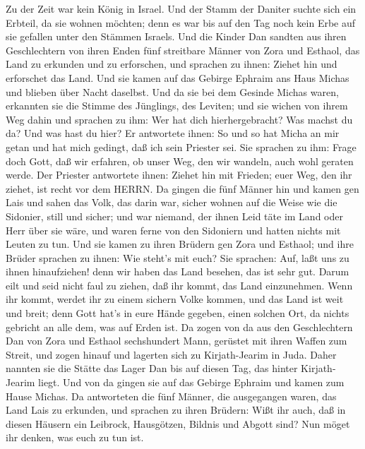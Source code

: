  Zu der Zeit war kein König in Israel. Und der Stamm der
Daniter suchte sich ein Erbteil, da sie wohnen möchten; denn es war bis
auf den Tag noch kein Erbe auf sie gefallen unter den Stämmen Israels.
 Und die Kinder Dan sandten aus ihren Geschlechtern von
ihren Enden fünf streitbare Männer von Zora und Esthaol, das Land zu
erkunden und zu erforschen, und sprachen zu ihnen: Ziehet hin und
erforschet das Land. Und sie kamen auf das Gebirge Ephraim ans Haus
Michas und blieben über Nacht daselbst.  Und da sie bei dem
Gesinde Michas waren, erkannten sie die Stimme des Jünglings, des
Leviten; und sie wichen von ihrem Weg dahin und sprachen zu ihm: Wer hat
dich hierhergebracht? Was machst du da? Und was hast du hier?
 Er antwortete ihnen: So und so hat Micha an mir getan und
hat mich gedingt, daß ich sein Priester sei.  Sie sprachen
zu ihm: Frage doch Gott, daß wir erfahren, ob unser Weg, den wir
wandeln, auch wohl geraten werde.  Der Priester antwortete
ihnen: Ziehet hin mit Frieden; euer Weg, den ihr ziehet, ist recht vor
dem HERRN.  Da gingen die fünf Männer hin und kamen gen Lais
und sahen das Volk, das darin war, sicher wohnen auf die Weise wie die
Sidonier, still und sicher; und war niemand, der ihnen Leid täte im Land
oder Herr über sie wäre, und waren ferne von den Sidoniern und hatten
nichts mit Leuten zu tun.  Und sie kamen zu ihren Brüdern
gen Zora und Esthaol; und ihre Brüder sprachen zu ihnen: Wie steht's mit
euch?  Sie sprachen: Auf, laßt uns zu ihnen hinaufziehen!
denn wir haben das Land besehen, das ist sehr gut. Darum eilt und seid
nicht faul zu ziehen, daß ihr kommt, das Land einzunehmen. 
Wenn ihr kommt, werdet ihr zu einem sichern Volke kommen, und das Land
ist weit und breit; denn Gott hat's in eure Hände gegeben, einen solchen
Ort, da nichts gebricht an alle dem, was auf Erden ist.  Da
zogen von da aus den Geschlechtern Dan von Zora und Esthaol sechshundert
Mann, gerüstet mit ihren Waffen zum Streit,  und zogen
hinauf und lagerten sich zu Kirjath-Jearim in Juda. Daher nannten sie
die Stätte das Lager Dan bis auf diesen Tag, das hinter Kirjath-Jearim
liegt.  Und von da gingen sie auf das Gebirge Ephraim und
kamen zum Hause Michas.  Da antworteten die fünf Männer,
die ausgegangen waren, das Land Lais zu erkunden, und sprachen zu ihren
Brüdern: Wißt ihr auch, daß in diesen Häusern ein Leibrock, Hausgötzen,
Bildnis und Abgott sind? Nun möget ihr denken, was euch zu tun ist.
